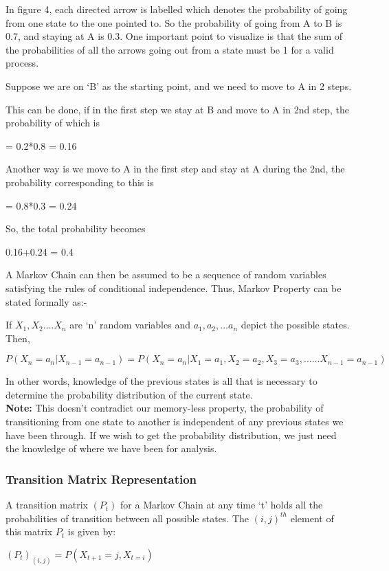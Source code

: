 \documentclass[10pt,twocolumn,letterpaper]{article}
\begin{document}
In figure 4, each directed arrow is labelled which denotes the probability of going from one state to the one pointed to. So the probability of going from A to B is 0.7, and staying at A is 0.3. One important point to visualize is that the sum of the probabilities of all the arrows going out from a state must be 1 for a valid process. 

Suppose we are on ‘B’ as the starting point, and we need to move to A in 2 steps. 

This can be done, if in the first step we stay at B and move to A in 2nd step, the probability of which is 
\begin{center}
     = 0.2*0.8 = 0.16 
\end{center}

Another way is we move to A in the first step and stay at A during the 2nd, the probability corresponding to this is 
\begin{center}
    = 0.8*0.3 = 0.24
\end{center}
So, the total probability becomes 
\begin{center}
    0.16+0.24 = 0.4
\end{center}

A Markov Chain can then be assumed to be a sequence of random variables satisfying the rules of conditional independence. Thus, Markov Property can be stated formally as:- 

If $X_1, X_2 …. X_n$ are ‘n’ random variables and $a_1, a_2,... a_n$ depict the possible states. Then,
\begin{center}
    $P(X_n = a_n | X_{n-1} = a_{n-1}) = P(X_n = a_n | X_1 = a_1, X_2 = a_2, X_3 = a_3, …... X_{n-1} = a_{n-1}) $
\end{center}

In other words, knowledge of the previous states is all that is necessary to determine the probability distribution of the current state.  \\

\textbf{Note:} This doesn’t contradict our memory-less property, the probability of transitioning from one state to another is independent of any previous states we have been through. If we wish to get the probability distribution, we just need the knowledge of where we have been for analysis.


\subsubsection{Transition Matrix Representation}
A transition matrix $(P_t)$ for a Markov Chain at any time ‘t’ holds all the probabilities of transition between all possible states. The $(i,j)^{th}$ element of this matrix $P_t$ is given by: 
\begin{center}
    $(P_t)_{(i,j)} = P(X_{t+1} = j, X_{t = i})$ 
\end{center}
\end{document}
